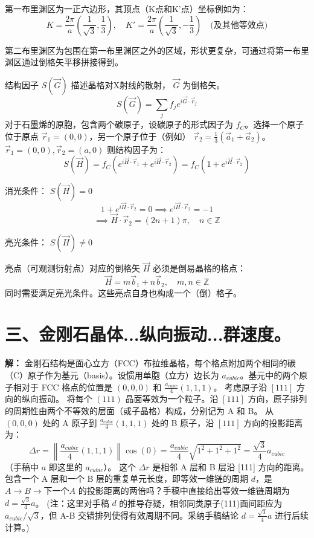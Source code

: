 \documentclass{ctexart}
\begin{document}
第一布里渊区为一正六边形，其顶点（K点和K'点）坐标例如为：
\[ K = \frac{2\pi}{a} \left( \frac{1}{\sqrt{3}}, \frac{1}{3} \right), \quad K' = \frac{2\pi}{a} \left( \frac{1}{\sqrt{3}}, -\frac{1}{3} \right) \quad \text{(及其他等效点)} \]

第二布里渊区为包围在第一布里渊区之外的区域，形状更复杂，可通过将第一布里渊区通过倒格矢平移拼接得到。

结构因子 $S(\vec{G})$ 描述晶格对X射线的散射， $\vec{G}$ 为倒格矢。
\[ S(\vec{G}) = \sum_j f_j e^{i \vec{G} \cdot \vec{r}_j} \]
对于石墨烯的原胞，包含两个碳原子，设碳原子的形式因子为 $f_C$。选择一个原子位于原点 $\vec{r}_1 = (0,0)$，另一个原子位于（例如） $\vec{r}_2 = \frac{1}{3}(\vec{a}_1 + \vec{a}_2)$。 
$\vec{r}_1=(0,0), \vec{r}_2=(a,0)$
则结构因子为：
\[ S(\vec{H}) = f_C (e^{i\vec{H} \cdot \vec{r}_1} + e^{i\vec{H} \cdot \vec{r}_2}) = f_C (1 + e^{i\vec{H} \cdot \vec{r}_2}) \]

消光条件： $S(\vec{H})=0$
\[ 1 + e^{i\vec{H} \cdot \vec{r}_2} = 0 \implies e^{i\vec{H} \cdot \vec{r}_2} = -1 \]
\[ \implies \vec{H} \cdot \vec{r}_2 = (2n+1)\pi, \quad n \in \mathbb{Z} \]

亮光条件： $S(\vec{H}) \neq 0$

亮点（可观测衍射点）对应的倒格矢 $\vec{H}$ 必须是倒易晶格的格点：
\[ \vec{H} = m\vec{b}_1 + n\vec{b}_2, \quad m, n \in \mathbb{Z} \]
同时需要满足亮光条件。这些亮点自身也构成一个（倒）格子。

\section*{三、金刚石晶体...纵向振动...群速度。}

\textbf{解：}
金刚石结构是面心立方（FCC）布拉维晶格，每个格点附加两个相同的碳（C）原子作为基元（basis）。设惯用单胞（立方）边长为 $a_{cubic}$。基元中的两个原子相对于 FCC 格点的位置是 $(0,0,0)$ 和 $\frac{a_{cubic}}{4}(1,1,1)$。
考虑原子沿 $[111]$ 方向的纵向振动。
将每个 $(111)$ 晶面等效为一个粒子。沿 $[111]$ 方向，原子排列的周期性由两个不等效的层面（或子晶格）构成，分别记为 A 和 B。
从 $(0,0,0)$ 处的 A 原子到 $\frac{a_{cubic}}{4}(1,1,1)$ 处的 B 原子，沿 $[111]$ 方向的投影距离为：
\[ \Delta r = \left\| \frac{a_{cubic}}{4}(1,1,1) \right\| \cos(0) = \frac{a_{cubic}}{4} \sqrt{1^2+1^2+1^2} = \frac{\sqrt{3}}{4} a_{cubic} \]
（手稿中 $a$ 即这里的 $a_{cubic}$）。
这个 $\Delta r$ 是相邻 A 层和 B 层沿 [111] 方向的距离。包含一个 A 层和一个 B 层的重复单元长度，即等效一维链的周期 $d$，是 $A \to B \to \text{下一个} A$ 的投影距离的两倍吗？手稿中直接给出等效一维链周期为 $d = \frac{\sqrt{3}}{4} a$。 (注：这里对手稿 $d$ 的推导存疑，相邻同类原子(111)面间距应为 $a_{cubic}/\sqrt{3}$，但 A-B 交错排列使得有效周期不同。采纳手稿结论 $d = \frac{\sqrt{3}}{4} a$ 进行后续计算。)
\end{document}
